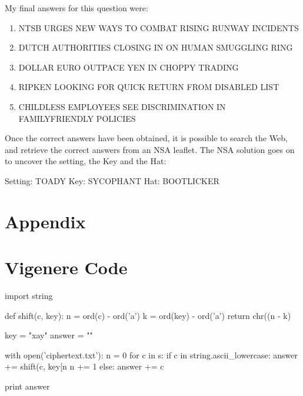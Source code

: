 \documentclass[11pt,a4paper,twoside]{article}
\begin{document}
My final answers for this question were: 


\begin{enumerate}[noitemsep]
\item NTSB URGES NEW WAYS TO COMBAT RISING RUNWAY INCIDENTS
\item DUTCH AUTHORITIES CLOSING IN ON HUMAN SMUGGLING RING
\item DOLLAR EURO OUTPACE YEN IN CHOPPY TRADING
\item RIPKEN LOOKING FOR QUICK RETURN FROM DISABLED LIST
\item CHILDLESS EMPLOYEES SEE DISCRIMINATION IN FAMILYFRIENDLY POLICIES
\end{enumerate}

Once the correct answers have been obtained, it is possible to search the Web,
and retrieve the correct answers from an NSA leaflet. The NSA solution goes on
to uncover the setting, the Key and the Hat: 

Setting: TOADY Key: SYCOPHANT Hat: BOOTLICKER



%
%
%

\vfill
\pagebreak
\section*{Appendix} 
\appendix 
\section{Vigenere Code}
\label{vig_code}
\begin{python}
import string

def shift(c, key):
    n = ord(c) - ord('a')
    k = ord(key) - ord('a')
    return chr((n - k) %

key = "xay"
answer = ""

with open('ciphertext.txt'):
    n = 0
    for c in s:
        if c in string.ascii_lowercase:
            answer += shift(c, key[n%
            n += 1
        else:
            answer += c
        
print answer
\end{python}
\end{document}
